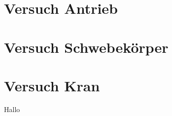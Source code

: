\documentclass[10pt]{scrartcl}
\begin{document}



\section{Versuch Antrieb}

\section{Versuch Schwebekörper}

\section{Versuch Kran}

Hallo
\end{document}
